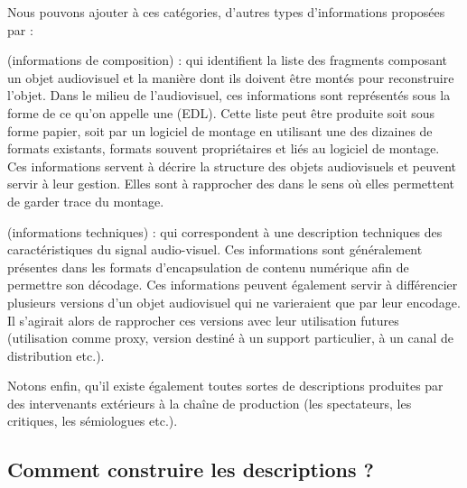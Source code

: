 Nous pouvons ajouter à ces catégories, d'autres types d'informations proposées par \cite{Rayers2002} : 
\begin{liste} 
	\item {} (informations de composition) : qui identifient la liste des fragments composant un objet audiovisuel et la manière dont ils doivent être montés pour reconstruire l'objet. 
	Dans le milieu de l'audiovisuel, ces informations sont représentés sous la forme de ce qu'on appelle une  (EDL).
	Cette liste peut être produite soit sous forme papier, soit par un logiciel de montage en utilisant une des dizaines de formats existants, formats souvent propriétaires et liés au logiciel de montage. 
	Ces informations servent à décrire la structure des objets audiovisuels et peuvent servir à leur gestion.
	Elles sont à rapprocher des  dans le sens où elles permettent de garder trace du montage. 


	\item {} (informations techniques) : qui correspondent à une description techniques des caractéristiques du signal audio-visuel. 
	Ces informations sont généralement présentes dans les formats d'encapsulation de contenu numérique afin de permettre son décodage.
	Ces informations peuvent également servir à différencier plusieurs versions d'un objet audiovisuel qui ne varieraient que par leur encodage. 
	Il s'agirait alors de rapprocher ces versions avec leur utilisation futures (utilisation comme proxy, version destiné à un support particulier, à un canal de distribution etc.).
\end{liste}


Notons enfin, qu'il existe également toutes sortes de descriptions produites par des intervenants extérieurs à la chaîne de production (les spectateurs, les critiques, les sémiologues etc.).



\subsection{Comment construire les descriptions ?} 
